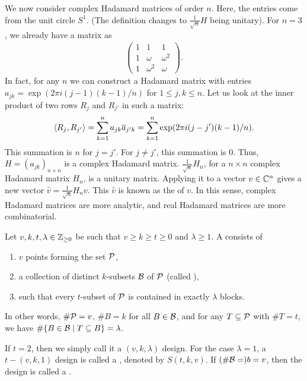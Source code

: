 We now consider complex Hadamard matrices of order $n$. Here, the entries come from the unit circle $S^{1}$. (The definition changes to $\frac{1}{\sqrt{n}} H$ being unitary). For $n = 3$, we already have a matrix as
\begin{align}
    \begin{pmatrix}
        1 & 1 & 1 \\
        1 & \omega & \omega^{2} \\
        1 & \omega^{2} & \omega
    \end{pmatrix}.
\end{align}
In fact, for any $n$ we can construct a Hadamard matrix with entries $a_{jk} = \exp(2\pi i (j-1)(k-1)/n)$ for $1 \leq j,k \leq n$. Let us look at the inner product of two rows $R_{j}$ and $R_{j'}$ in such a matrix:
\begin{align}
    \langle R_{j},R_{j'}\rangle = \sum_{k=1}^{n} a_{jk} \overline{a}_{j'k} = \sum_{k=1}^{n} \exp(2\pi i(j-j')(k-1)/n).
\end{align}
This summation is $n$ for $j = j'$. For $j \neq j'$, this summation is 0. Thus, $H = (a_{jk})_{n \times n}$ is a complex Hadamard matrix. $\frac{1}{\sqrt{n}} H_{n}$, for a $n \times n$ complex Hadamard matrix $H_{n}$, is a unitary matrix. Applying it to a vector $v \in \mathbb{C}^{n}$ gives a new vector $\hat{v} = \frac{1}{\sqrt{n}} H_{n} v$. This $\hat{v}$ is known as the  of $v$. In this sense, complex Hadamard matrices are more analytic, and real Hadamard matrices are more combinatorial.

\begin{definition}
    Let $v,k,t,\lambda \in \mathbb{Z}_{\geq 0}$ be such that $v \geq k \geq t \geq 0$ and $\lambda \geq 1$. A  consists of
    \begin{enumerate}
        \item $v$ points forming the set $\mathcal{P}$,
        \item a collection of distinct $k$-subsets $\mathcal{B}$ of $\mathcal{P}$ (called ),
        \item such that every $t$-subset of $\mathcal{P}$ is contained in exactly $\lambda$ blocks.
    \end{enumerate}
    In other words, $\# \mathcal{P} = v$, $\# B = k$ for all $B \in \mathcal{B}$, and for any $T \subseteq \mathcal{P}$ with $\# T = t$, we have $\# \{B \in \mathcal{B} \mid T \subseteq B\} = \lambda$.
\end{definition}

If $t = 2$, then we simply call it a $(v,k,\lambda)$ design. For the case $\lambda = 1$, a $t-(v,k,1)$ design is called a , denoted by $S(t,k,v)$. If $(\#\mathcal{B} = ) b = v$, then the design is called a .

